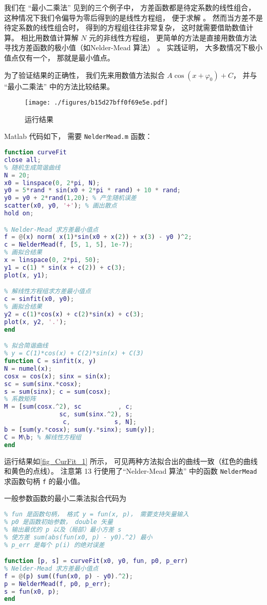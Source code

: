 
我们在 “最小二乘法” 见到的三个例子中， 方差函数都是待定系数的线性组合， 这种情况下我们令偏导为零后得到的是线性方程组， 便于求解 %
。 然而当方差不是待定系数的线性组合时， 得到的方程组往往非常复杂， 这时就需要借助数值计算。 相比用数值计算解 $N$ 元的非线性方程组， 更简单的方法是直接用数值方法寻找方差函数的极小值（如Nelder-Mead 算法） 。 实践证明， 大多数情况下极小值点仅有一个， 那就是最小值点。

为了验证结果的正确性， 我们先来用数值方法拟合 $A\cos (x + \varphi_0) + C$， 并与 “最小二乘法” 中的方法比较结果。

\begin{figure}[ht]
\centering
\texttt{[image: ./figures/b15d27bff0f69e5e.pdf]}
\caption{运行结果} \label{fig_CurFit_1}
\end{figure}

Matlab 代码如下， 需要 \verb|NelderMead.m| 函数：
\begin{lstlisting}[language=matlab, caption=curveFit\_test.m]
function curveFit
close all;
% 随机生成简谐曲线
N = 20;
x0 = linspace(0, 2*pi, N);
y0 = 5*rand * sin(x0 + 2*pi * rand) + 10 * rand;
y0 = y0 + 2*rand(1,20); % 产生随机误差
scatter(x0, y0, '+'); % 画出散点
hold on;

% Nelder-Mead 求方差最小值点
f = @(x) norm( x(1)*sin(x0 + x(2)) + x(3) - y0 )^2;
c = NelderMead(f, [5, 1, 5], 1e-7);
% 画拟合结果
x = linspace(0, 2*pi, 50);
y1 = c(1) * sin(x + c(2)) + c(3);
plot(x, y1);

% 解线性方程组求方差最小值点
c = sinfit(x0, y0);
% 画拟合结果
y2 = c(1)*cos(x) + c(2)*sin(x) + c(3);
plot(x, y2, '.');
end

% 拟合简谐曲线
% y = C(1)*cos(x) + C(2)*sin(x) + C(3)
function C = sinfit(x, y)
N = numel(x);
cosx = cos(x); sinx = sin(x);
sc = sum(sinx.*cosx);
s = sum(sinx); c = sum(cosx);
% 系数矩阵
M = [sum(cosx.^2), sc          , c;
               sc, sum(sinx.^2), s;
                c,            s, N];
b = [sum(y.*cosx); sum(y.*sinx); sum(y)];
C = M\b; % 解线性方程组
end
\end{lstlisting}

运行结果如\autoref{fig_CurFit_1} 所示， 可见两种方法拟合出的曲线一致（红色的曲线和黄色的点线）。 注意第 13 行使用了“Nelder-Mead 算法” 中的函数 \verb|NelderMead| 求函数句柄 \verb|f| 的最小值。

一般参数函数的最小二乘法拟合代码为
\begin{lstlisting}[language=matlab, caption=curveFit.m]
% 最小二乘法拟合一元实函数，(x0,y0) 是数据点
% fun 是函数句柄， 格式 y = fun(x, p)， 需要支持矢量输入
% p0 是函数初始参数， double 矢量
% 输出最优的 p 以及（局部）最小方差 s
% 使方差 sum(abs(fun(x0, p) - y0).^2) 最小
% p_err 是每个 p(i) 的绝对误差

function [p, s] = curveFit(x0, y0, fun, p0, p_err)
% Nelder-Mead 求方差最小值点
f = @(p) sum((fun(x0, p) - y0).^2);
p = NelderMead(f, p0, p_err);
s = fun(x0, p);
end
\end{lstlisting}
